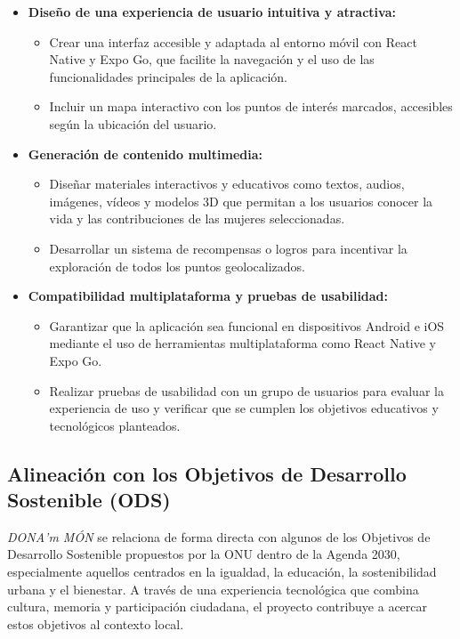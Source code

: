 \begin{itemize}
    \item \textbf{Diseño de una experiencia de usuario intuitiva y atractiva:}
    \begin{itemize}
        \item Crear una interfaz accesible y adaptada al entorno móvil con React Native y Expo Go, que facilite la navegación y el uso de las funcionalidades principales de la aplicación.
        \item Incluir un mapa interactivo con los puntos de interés marcados, accesibles según la ubicación del usuario.
    \end{itemize}

    \item \textbf{Generación de contenido multimedia:}
    \begin{itemize}
        \item Diseñar materiales interactivos y educativos como textos, audios, imágenes, vídeos y modelos 3D que permitan a los usuarios conocer la vida y las contribuciones de las mujeres seleccionadas.
        \item Desarrollar un sistema de recompensas o logros para incentivar la exploración de todos los puntos geolocalizados.
    \end{itemize}

    \item \textbf{Compatibilidad multiplataforma y pruebas de usabilidad:}
    \begin{itemize}
        \item Garantizar que la aplicación sea funcional en dispositivos Android e iOS mediante el uso de herramientas multiplataforma como React Native y Expo Go.
        \item Realizar pruebas de usabilidad con un grupo de usuarios para evaluar la experiencia de uso y verificar que se cumplen los objetivos educativos y tecnológicos planteados.
    \end{itemize}
\end{itemize}

\subsection{Alineación con los Objetivos de Desarrollo Sostenible (ODS)}

\textit{DONA'm MÓN} se relaciona de forma directa con algunos de los Objetivos de Desarrollo Sostenible propuestos por la ONU dentro de la Agenda 2030, especialmente aquellos centrados en la igualdad, la educación, la sostenibilidad urbana y el bienestar. A través de una experiencia tecnológica que combina cultura, memoria y participación ciudadana, el proyecto contribuye a acercar estos objetivos al contexto local. \cite{onuAgenda2030,odsIgualdad,odsCiudades}

